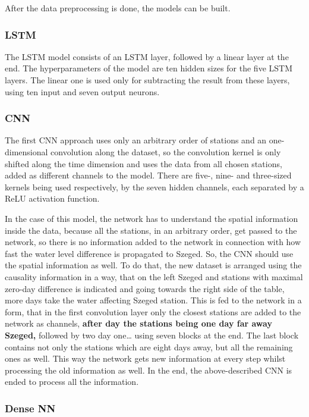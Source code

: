 \documentclass{article}
\newcommand{\tmstrong}[1]{\textbf{#1}}
\begin{document}
After the data preprocessing is done, the models can be built.

\subsubsection{LSTM}

The LSTM model consists of an LSTM layer, followed by a linear layer at the
end. The hyperparameters of the model are ten hidden sizes for the five LSTM
layers. The linear one is used only for subtracting the result from these
layers, using ten input and seven output neurons.

\subsubsection{CNN}

The first CNN approach uses only an arbitrary order of stations and an
one-dimensional convolution along the dataset, so the convolution kernel is
only shifted along the time dimension and uses the data from all chosen
stations, added as different channels to the model. There are five-, nine- and
three-sized kernels being used respectively, by the seven hidden channels,
each separated by a ReLU activation function.

In the case of this model, the network has to understand the spatial
information inside the data, because all the stations, in an arbitrary order,
get passed to the network, so there is no information added to the network in
connection with how fast the water level difference is propagated to Szeged.
So, the CNN should use the spatial information as well. To do that, the new
dataset is arranged using the causality information in a way, that on the left
Szeged and stations with maximal zero-day difference is indicated and going
towards the right side of the table, more days take the water affecting Szeged
station. This is fed to the network in a form, that in the first convolution
layer only the closest stations are added to the network as channels,
{\tmstrong{after day the stations being one day far away Szeged,}} followed by
two day one{\ldots} using seven blocks at the end. The last block contains not
only the stations which are eight days away, but all the remaining ones as
well. This way the network gets new information at every step whilst
processing the old information as well. In the end, the above-described CNN is
ended to process all the information.

\subsubsection{Dense NN}
\end{document}
